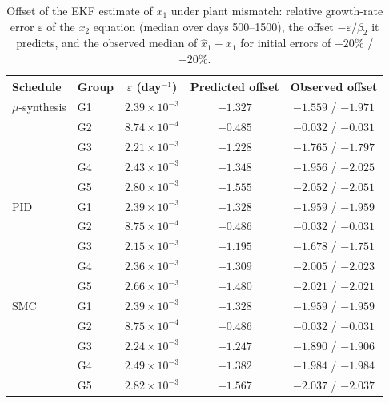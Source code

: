 \begin{table}[htbp]
\centering
\caption{Offset of the EKF estimate of $x_1$ under plant mismatch: relative growth-rate error $\varepsilon$ of the $x_2$ equation (median over days 500--1500), the offset $-\varepsilon/\beta_2$ it predicts, and the observed median of $\hat{x}_1-x_1$ for initial errors of $+20\%$ / $-20\%$.}
\label{tab:observer_bias}
\small
\begin{tabular}{llccc}
\toprule
Schedule & Group & $\varepsilon$ (day$^{-1}$) & Predicted offset & Observed offset \\
\midrule
$\mu$-synthesis & G1 & $2.39{\times}10^{-3}$ & $-1.327$ & $-1.559$ / $-1.971$ \\
 & G2 & $8.74{\times}10^{-4}$ & $-0.485$ & $-0.032$ / $-0.031$ \\
 & G3 & $2.21{\times}10^{-3}$ & $-1.228$ & $-1.765$ / $-1.797$ \\
 & G4 & $2.43{\times}10^{-3}$ & $-1.348$ & $-1.956$ / $-2.025$ \\
 & G5 & $2.80{\times}10^{-3}$ & $-1.555$ & $-2.052$ / $-2.051$ \\
\addlinespace
PID & G1 & $2.39{\times}10^{-3}$ & $-1.328$ & $-1.959$ / $-1.959$ \\
 & G2 & $8.75{\times}10^{-4}$ & $-0.486$ & $-0.032$ / $-0.031$ \\
 & G3 & $2.15{\times}10^{-3}$ & $-1.195$ & $-1.678$ / $-1.751$ \\
 & G4 & $2.36{\times}10^{-3}$ & $-1.309$ & $-2.005$ / $-2.023$ \\
 & G5 & $2.66{\times}10^{-3}$ & $-1.480$ & $-2.021$ / $-2.021$ \\
\addlinespace
SMC & G1 & $2.39{\times}10^{-3}$ & $-1.328$ & $-1.959$ / $-1.959$ \\
 & G2 & $8.75{\times}10^{-4}$ & $-0.486$ & $-0.032$ / $-0.031$ \\
 & G3 & $2.24{\times}10^{-3}$ & $-1.247$ & $-1.890$ / $-1.906$ \\
 & G4 & $2.49{\times}10^{-3}$ & $-1.382$ & $-1.984$ / $-1.984$ \\
 & G5 & $2.82{\times}10^{-3}$ & $-1.567$ & $-2.037$ / $-2.037$ \\
\bottomrule
\end{tabular}
\end{table}
